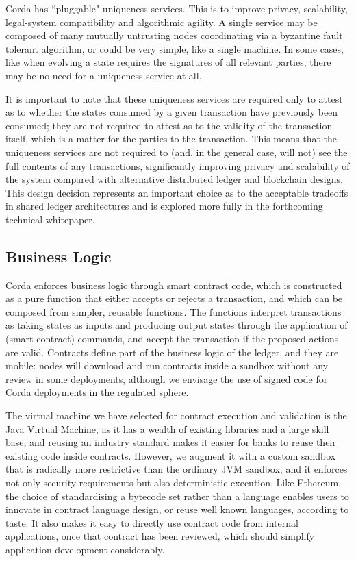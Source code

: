 \documentclass{article}
\begin{document}
Corda has ``pluggable" uniqueness services. This is to improve privacy, scalability, legal-system compatibility\cite{EUC} and algorithmic agility. A single service may be composed of many mutually untrusting nodes coordinating via a byzantine fault tolerant algorithm, or could be very simple, like a single machine. In some cases, like when evolving a state requires the signatures of all relevant parties, there may be no need for a uniqueness service at all. 

It is important to note that these uniqueness services are required only to attest as to whether the states consumed by a given transaction have previously been consumed; they are not required to attest as to the validity of the transaction itself, which is a matter for the parties to the transaction. This means that the uniqueness services are not required to (and, in the general case, will not) see the full contents of any transactions, significantly improving privacy and scalability of the system compared with alternative distributed ledger and blockchain designs.  This design decision represents an important choice as to the acceptable tradeoffs in shared ledger architectures and is explored more fully in the forthcoming technical whitepaper.

\subsection{Business Logic}
Corda enforces business logic through smart contract code, which is constructed as a pure function that either accepts or rejects a transaction, and which can be composed from simpler, reusable functions. The functions interpret transactions as taking states as inputs and producing output states through the application of (smart contract) commands, and accept the transaction if the proposed actions are valid. Contracts define part of the business logic of the ledger, and they are mobile: nodes will download and run contracts inside a sandbox without any review in some deployments, although we envisage the use of signed code for Corda deployments in the regulated sphere. 

The virtual machine we have selected for contract execution and validation is the Java Virtual Machine\cite{JVM}, as it has a wealth of existing libraries and a large skill base, and reusing an industry standard makes it easier for banks to reuse their existing code inside contracts. However, we augment it with a custom sandbox that is radically more restrictive than the ordinary JVM sandbox, and it enforces not only security requirements but also deterministic execution. Like Ethereum\cite{Ethereum}, the choice of standardising a bytecode set rather than a language enables users to innovate in contract language design, or reuse well known languages, according to taste. It also makes it easy to directly use contract code from internal applications, once that contract has been reviewed, which should simplify application development considerably.
\end{document}
